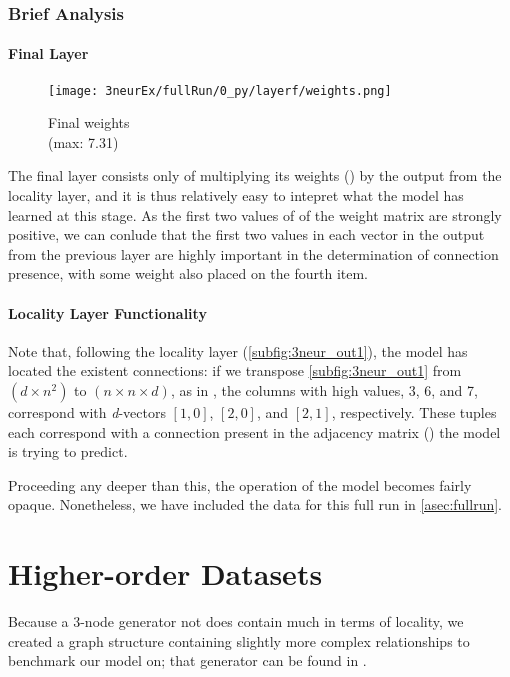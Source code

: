 \subsubsection{Brief Analysis}
\paragraph{Final Layer}
\begin{wrapfigure}[5]{r}{.25\textwidth}
	\centering
	\vspace{-15pt}
	\texttt{[image: 3neurEx/fullRun/0\_py/layerf/weights.png]}
	\caption{Final weights\\(max: 7.31)}
	\label{fig:3neur_flayer}
\end{wrapfigure}
The final layer consists only of multiplying its weights 
() by the output from the locality layer, and it is 
thus relatively easy to intepret what the model has learned at this stage. As 
the first two values of of the weight matrix are strongly positive, we can 
conlude that the first two values in each vector in the output from the previous 
layer are highly important in the determination of connection presence, with 
some weight also placed on the fourth item.

\paragraph{Locality Layer Functionality}

Note that, following the locality layer (\ref{subfig:3neur_out1}), the model has 
located the existent connections: if we transpose \ref{subfig:3neur_out1} from 
$(d \times n^2)$ to $(n \times n \times d)$, as in , the 
columns with high values, 3, 6, and 7, correspond with \textit{d}-vectors 
$[1,0]$, $[2,0]$, and $[2,1]$, respectively. These tuples each correspond with a 
connection present in the adjacency matrix () the model is 
trying to predict.
\vspace{\baselineskip}

\noindent Proceeding any deeper than this, the operation of the model becomes 
fairly opaque. Nonetheless, we have included the data for this full run in 
\ref{asec:fullrun}.

\section{Higher-order Datasets}
\label{sec:localitybroken}
Because a 3-node generator not does contain much in terms of locality, we 
created a graph structure containing slightly more complex relationships to 
benchmark our model on; that generator can be found in .
 
